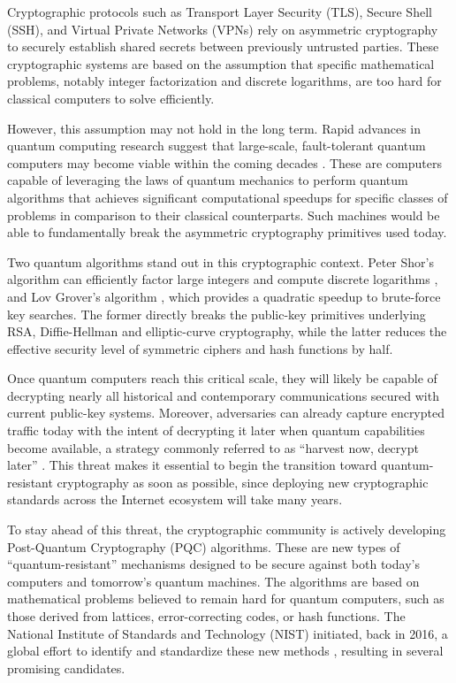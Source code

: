 Cryptographic protocols such as Transport Layer Security (TLS), Secure Shell (SSH), and Virtual Private Networks (VPNs) rely on asymmetric cryptography to securely establish shared secrets between previously untrusted parties. These cryptographic systems are based on the assumption that specific mathematical problems, notably integer factorization and discrete logarithms, are too hard for classical computers to solve efficiently.

However, this assumption may not hold in the long term. Rapid advances in quantum computing research suggest that large-scale, fault-tolerant quantum computers may become viable within the coming decades \cite{Swayne2025QuantumRoadmaps}. These are computers capable of leveraging the laws of quantum mechanics to perform quantum algorithms that achieves significant computational speedups for specific classes of problems in comparison to their classical counterparts. Such machines would be able to fundamentally break the asymmetric cryptography primitives used today. 

Two quantum algorithms stand out in this cryptographic context. Peter Shor's algorithm can efficiently factor large integers and compute discrete logarithms \cite{shors}, and Lov Grover's algorithm \cite{grovers}, which provides a quadratic speedup to brute-force key searches. The former directly breaks the public-key primitives underlying RSA, Diffie-Hellman and elliptic-curve cryptography, while the latter reduces the effective security level of symmetric ciphers and hash functions by half.

Once quantum computers reach this critical scale, they will likely be capable of decrypting nearly all historical and contemporary communications secured with current public-key systems. Moreover, adversaries can already capture encrypted traffic today with the intent of decrypting it later when quantum capabilities become available, a strategy commonly referred to as ``harvest now, decrypt later'' \cite{hndl}. This threat makes it essential to begin the transition toward quantum-resistant cryptography as soon as possible, since deploying new cryptographic standards across the Internet ecosystem will take many years.

To stay ahead of this threat, the cryptographic community is actively developing Post-Quantum Cryptography (PQC) algorithms. These are new types of ``quantum-resistant'' mechanisms designed to be secure against both today's computers and tomorrow's quantum machines. The algorithms are based on mathematical problems believed to remain hard for quantum computers, such as those derived from lattices, error-correcting codes, or hash functions. The National Institute of Standards and Technology (NIST) initiated, back in 2016, a global effort to identify and standardize these new methods \cite{nistpqc}, resulting in several promising candidates.

